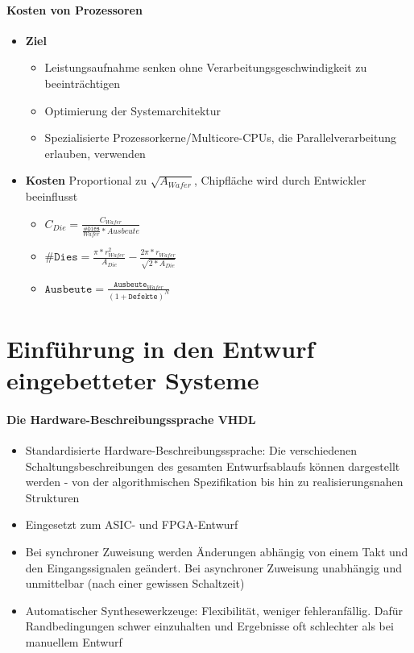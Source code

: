 	\paragraph{Kosten von Prozessoren}
		\begin{itemize}
			\item \textbf{Ziel}
			\begin{itemize}
				\item Leistungsaufnahme senken ohne Verarbeitungsgeschwindigkeit zu beeinträchtigen
				\item Optimierung der Systemarchitektur
				\item Spezialisierte Prozessorkerne/Multicore-CPUs, die Parallelverarbeitung erlauben, verwenden
			\end{itemize}
			\item \textbf{Kosten} Proportional zu $\sqrt{A_{Wafer}}$, Chipfläche wird durch Entwickler beeinflusst
			\begin{itemize}
				\item $C_{Die}=\frac{C_{Wafer}}{\frac{\texttt{\#Dies}}{Wafer}*Ausbeute}$
				\item $\texttt{\#Dies}=\frac{\pi*r_{Wafer}^2}{A_{Die}}-\frac{2\pi*r_{Wafer}}{\sqrt{2*A_{Die}}}$
				\item $\texttt{Ausbeute}=\frac{\texttt{Ausbeute}_{Wafer}}{(1+\texttt{Defekte})^N}$
			\end{itemize}
		\end{itemize}

\section{Einführung in den Entwurf eingebetteter Systeme}
	\paragraph{Die Hardware-Beschreibungssprache VHDL}
		\begin{itemize}
			\item Standardisierte Hardware-Beschreibungssprache: Die verschiedenen Schaltungsbeschreibungen des gesamten Entwurfsablaufs können dargestellt werden - von der algorithmischen Spezifikation bis hin zu realisierungsnahen Strukturen
			\item Eingesetzt zum ASIC- und FPGA-Entwurf
			\item Bei synchroner Zuweisung werden Änderungen abhängig von einem Takt und den Eingangssignalen geändert. Bei asynchroner Zuweisung unabhängig und unmittelbar (nach einer gewissen Schaltzeit)
			\item Automatischer Synthesewerkzeuge: Flexibilität, weniger fehleranfällig. Dafür Randbedingungen schwer einzuhalten und Ergebnisse oft schlechter als bei manuellem Entwurf
		\end{itemize}

